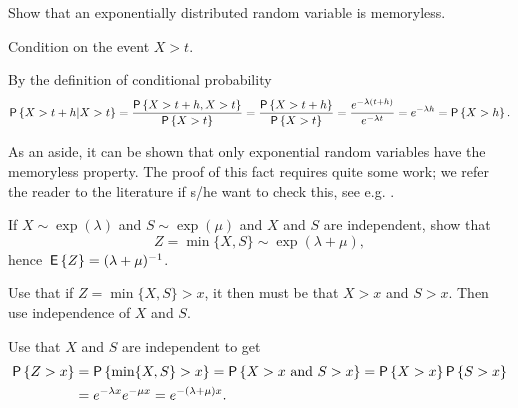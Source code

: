 \begin{exercise}
  Show that an exponentially distributed random variable is
  memoryless.  
  \begin{hint}
Condition on the event ${X>t}$. 
  \end{hint}
  \begin{solution}
By  the definition of conditional probability
\begin{equation*}
  \P{X>t+h|X>t} = \frac{\P{X>t+h, X>t}}{\P{X>t}} = \frac{\P{X>t+h}}{\P{X>t}} = \frac{e^{-\lambda(t+h)}}{e^{-\lambda t}} = e^{-\lambda h} = \P{X>h}.
\end{equation*}

As an aside,  it can be shown that only exponential random variables have the
memoryless property. The proof of this fact requires quite some work;
we refer the reader to the literature if s/he want to check this, see
e.g. \citet[Appendix 3]{yushkevich69:_markov_proces}.
  \end{solution}
\end{exercise}


\begin{exercise}\label{ex:10}
  If $X\sim\exp(\lambda)$ and $S\sim\exp(\mu)$ and $X$ and $S$ are
  independent, show that 
  \begin{equation*}
Z=\min\{X,S\}\sim\exp(\lambda+\mu),
  \end{equation*}
hence $\,\mathsf{E}\left\{Z\right\} = (\lambda+\mu)^{-1}$.
\begin{hint}
Use that if $Z=\min\{X, S\}>x$,  it then must be that $X>x$
  and $S>x$. Then use independence of $X$ and $S$.
\end{hint}
  \begin{solution}
Use that $X$ and $S$ are independent to get
    \begin{equation*}
      \begin{split}
      \P{Z>x} 
&= \P{\min\{X,S\}>x} = \P{X>x\text{ and } S>x} = \P{X>x}\P{S>x} \\
&= e^{-\lambda x} e^{-\mu x} = e^{-(\lambda+\mu)x}.
      \end{split}
    \end{equation*}
  \end{solution}

\end{exercise}

